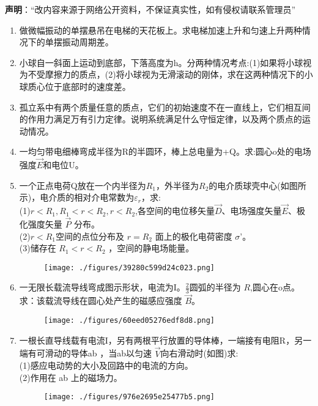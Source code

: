 
\textbf{声明}：“改内容来源于网络公开资料，不保证真实性，如有侵权请联系管理员”
\begin{enumerate}
\item 做微幅振动的单摆悬吊在电梯的天花板上。求电梯加速上升和匀速上升两种情况下的单摆振动周期差。
\item 小球自一斜面上运动到底部，下落高度为h。分两种情况考点:(1)如果将小球视为不受摩擦力的质点，(2)将小球视为无滑滚动的刚体，求在这两种情况下的小球质心位于底部时的速度差。
\item 孤立系中有两个质量任意的质点，它们的初始速度不在一直线上，它们相互间的作用力满足万有引力定律。说明系统满足什么守恒定律，以及两个质点的运动情况。
\item 一均匀带电细棒弯成半径为R的半圆环，棒上总电量为+Q。求:圆心o处的电场强度$\vec E$和电位U。
\item 一个正点电荷Q放在一个内半径为$R_1$，外半径为$R_2$的电介质球壳中心(如图所示)，电介质的相对介电常数为$\varepsilon_r$，求:\\
(1)$r<R_1,R_1<r<R_2,r<R_2$,各空间的电位移矢量$\vec D$、电场强度矢量$\vec{E}$、极化强度矢量 $\vec P$ 分布。\\
(2)$r<R_1$空间的点位分布及 $r=R_2$ 面上的极化电荷密度 $\sigma$'。\\
(3)储存在 $R_1<r<R_2$ ，空间的静电场能量。
\begin{figure}[ht]
\centering
\texttt{[image: ./figures/39280c599d24c023.png]}
\caption{} \label{fig_SSD103_2}
\end{figure}
\item 一无限长载流导线弯成图示形状，电流为I。$\frac{2}{3}$圆弧的半径为 $R$,圆心在o点。求：该载流导线在圆心处产生的磁感应强度 $\vec B$。
\begin{figure}[ht]
\centering
\texttt{[image: ./figures/60eed05276edf8d8.png]}
\caption{} \label{fig_SSD103_3}
\end{figure}
\item 一根长直导线载有电流I，另有两根平行放置的导体棒，一端接有电阻R，另一端有可滑动的导体ab ，当ab以匀速 $\vec V$向右滑动时(如图)求:\\
(1)感应电动势的大小及回路中的电流的方向。\\
(2)作用在 ab 上的磁场力。
\begin{figure}[ht]
\centering
\texttt{[image: ./figures/976e2695e25477b5.png]}
\caption{} \label{fig_SSD103_5}
\end{figure}

\end{enumerate}

